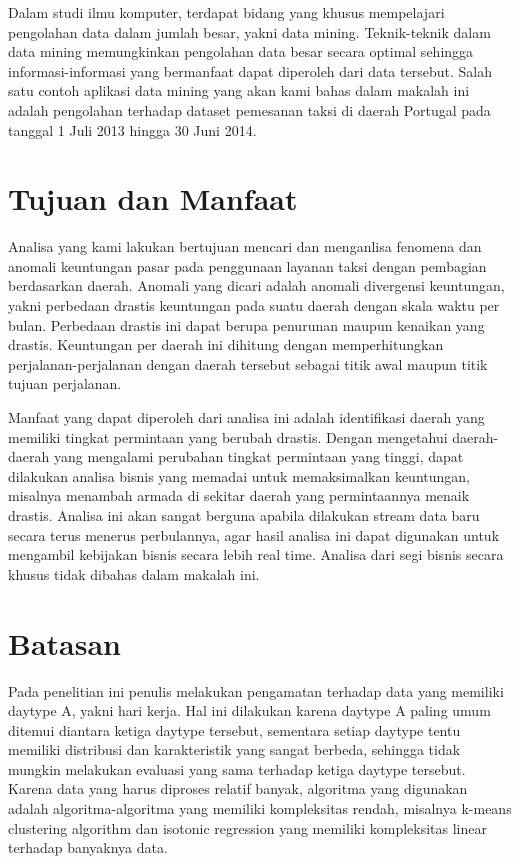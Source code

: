 \documentclass{article}
\begin{document}
Dalam studi ilmu komputer, terdapat bidang yang khusus mempelajari pengolahan data dalam jumlah besar, yakni data mining. Teknik-teknik dalam data mining memungkinkan pengolahan data besar secara optimal sehingga informasi-informasi yang bermanfaat dapat diperoleh dari data tersebut. Salah satu contoh aplikasi data mining yang akan kami bahas dalam makalah ini adalah pengolahan terhadap dataset pemesanan taksi di daerah Portugal pada tanggal 1 Juli 2013 hingga 30 Juni 2014.


\section{Tujuan dan Manfaat}

Analisa yang kami lakukan bertujuan mencari dan menganlisa fenomena dan anomali keuntungan pasar pada penggunaan layanan taksi dengan pembagian berdasarkan daerah. Anomali yang dicari adalah anomali divergensi keuntungan, yakni perbedaan drastis keuntungan pada suatu daerah dengan skala waktu per bulan. Perbedaan drastis ini dapat berupa penurunan maupun kenaikan yang drastis. Keuntungan per daerah ini dihitung dengan memperhitungkan perjalanan-perjalanan dengan daerah tersebut sebagai titik awal maupun titik tujuan perjalanan.

Manfaat yang dapat diperoleh dari analisa ini adalah identifikasi daerah yang memiliki tingkat permintaan yang berubah drastis. Dengan mengetahui daerah-daerah yang mengalami perubahan tingkat permintaan yang tinggi, dapat dilakukan analisa bisnis yang memadai untuk memaksimalkan keuntungan, misalnya menambah armada di sekitar daerah yang permintaannya menaik drastis. Analisa ini akan sangat berguna apabila dilakukan stream data baru secara terus menerus perbulannya, agar hasil analisa ini dapat digunakan untuk mengambil kebijakan bisnis secara lebih real time.  Analisa dari segi bisnis secara khusus tidak dibahas dalam makalah ini.

\section{Batasan}

Pada penelitian ini penulis melakukan pengamatan terhadap data yang memiliki daytype A, yakni hari kerja. Hal ini dilakukan karena daytype A paling umum ditemui diantara ketiga daytype tersebut, sementara setiap daytype tentu memiliki distribusi dan karakteristik yang sangat berbeda, sehingga tidak mungkin melakukan evaluasi yang sama terhadap ketiga daytype tersebut. Karena data yang harus diproses relatif banyak, algoritma yang digunakan adalah algoritma-algoritma yang memiliki kompleksitas rendah, misalnya k-means clustering algorithm dan  isotonic regression yang memiliki kompleksitas linear terhadap banyaknya data.
\end{document}
